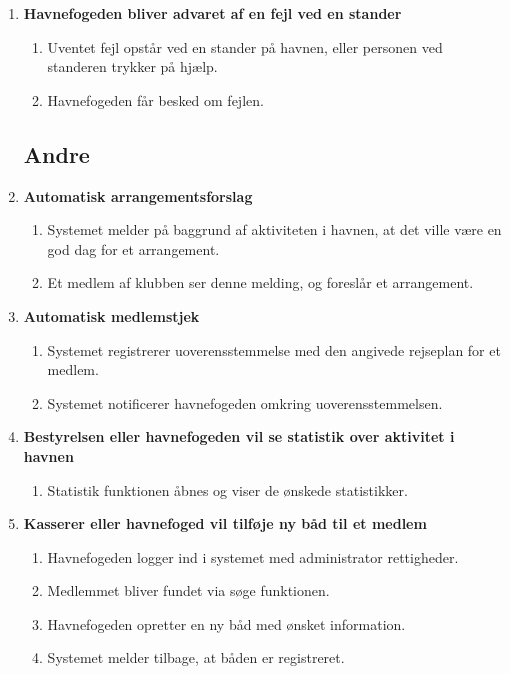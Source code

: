 \begin{enumerate}
    \item{\textbf{Havnefogeden bliver advaret af en fejl ved en stander}}
      \begin{enumerate}
        \item Uventet fejl opstår ved en stander på havnen, eller personen ved standeren trykker på hjælp.
        \item Havnefogeden får besked om fejlen.
      \end{enumerate}

\subsection{Andre}

    \item{\textbf{Automatisk arrangementsforslag}}
      \begin{enumerate}
        \item Systemet melder på baggrund af aktiviteten i havnen, at det ville være en god dag for et arrangement.
        \item Et medlem af klubben ser denne melding, og foreslår et arrangement.
      \end{enumerate}

    \item{\textbf{Automatisk medlemstjek}}
      \begin{enumerate}
        \item Systemet registrerer uoverensstemmelse med den angivede rejseplan for et medlem.
        \item Systemet notificerer havnefogeden omkring uoverensstemmelsen.
      \end{enumerate}

    \item{\textbf{Bestyrelsen eller havnefogeden vil se statistik over aktivitet i havnen}}
      \begin{enumerate}
        \item Statistik funktionen åbnes og viser de ønskede statistikker.
      \end{enumerate}
	  
	\item{\textbf{Kasserer eller havnefoged vil tilføje ny båd til et medlem}}
	  \begin{enumerate}
		\item Havnefogeden logger ind i systemet med administrator rettigheder.
		\item Medlemmet bliver fundet via søge funktionen.
		\item Havnefogeden opretter en ny båd med ønsket information.
		\item Systemet melder tilbage, at båden er registreret.
	   \end{enumerate}
\end{enumerate}
